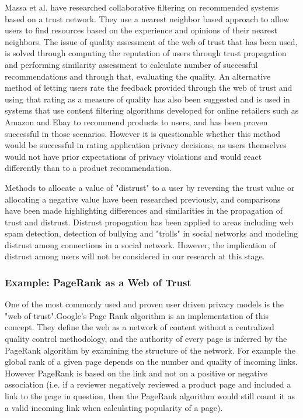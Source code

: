Massa et al. have researched collaborative filtering on recommended systems based on a trust network\cite{massa2004trust}. They use a nearest neighbor based approach to allow users to find resources based on the experience and opinions of their nearest neighbors. The issue of quality assessment of the web of trust that has been used, is solved through computing the reputation of users through trust propagation and performing similarity assessment to calculate number of successful recommendations and through that, evaluating the quality. An alternative method of letting users rate the feedback provided through the web of trust and using that rating as a measure of quality has also been suggested and is used in systems that use content filtering algorithms developed for online retailers such as Amazon and Ebay to recommend products to users, and has been proven successful in those scenarios. However it is questionable whether this method would be successful in rating application privacy decisions, as users themselves would not have prior expectations of privacy violations and would react differently than to a product recommendation. 
\smallskip

Methods to allocate a value of "distrust" to a user by reversing the trust value or allocating a negative value have been researched previously, and comparisons have been made highlighting differences and similarities in the propagation of trust and distrust\cite{guha2004propagation}. Distrust propogation has been applied to areas including web spam detection\cite{wu2006propagating}, detection of bullying and "trolls" in social networks\cite{ortega2012propagation} and modeling distrust among connections in a social network\cite{ziegler2005propagation}. However, the implication of distrust among users will not be considered in our research at this stage. 


\subsubsection{Example: PageRank as a Web of Trust}
One of the most commonly used and proven user driven privacy models is the "web of trust".Google's Page Rank algorithm is an implementation of this concept\cite{page1999pagerank}. They define the web as a network of content without a centralized quality control methodology, and the authority of every page is inferred by the PageRank algorithm by examining the structure of the network. For example the global rank of a given page depends on the number and quality of incoming links. However PageRank is based on the link and not on a positive or negative association (i.e. if a reviewer negatively reviewed a product page and included a link to the page in question, then the PageRank algorithm would still count it as a valid incoming link when calculating popularity of a page). 
\smallskip

